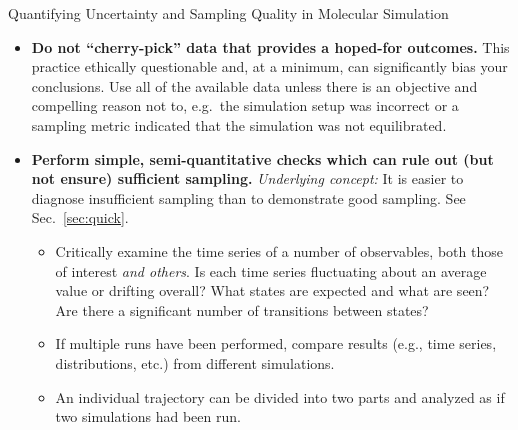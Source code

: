 \begin{Checklists*}[p!]
\begin{checklist}{Quantifying Uncertainty and Sampling Quality in Molecular Simulation}
\begin{itemize}
\item
  \textbf{Do not ``cherry-pick'' data that provides a hoped-for outcomes.}
  This practice ethically questionable and, at a minimum, can significantly bias your conclusions.
  Use all of the available data unless there is an objective and compelling reason not to, e.g.\ the simulation setup was incorrect or a sampling metric indicated that the simulation was not equilibrated.
    
\item
\textbf{Perform simple, semi-quantitative checks which can rule out (but not ensure) sufficient sampling.} \emph{Underlying concept:} It is easier to diagnose insufficient sampling than to demonstrate good sampling.  See Sec.\ \ref{sec:quick}.
    \begin{itemize}
    \item Critically examine the time series of a number of observables, both those of interest \emph{and others}.
      Is each time series fluctuating about an average value or drifting overall?
      What states are expected and what are seen?
      Are there a significant number of transitions between states?
    \item If multiple runs have been performed, compare results (e.g., time series, distributions, etc.) from different simulations.
    \item An individual trajectory can be divided into two parts and analyzed as if two simulations had been run.
    \end{itemize}
        \vspace{-0.325\baselineskip} %


\end{itemize}
\end{checklist}
\end{Checklists*}
